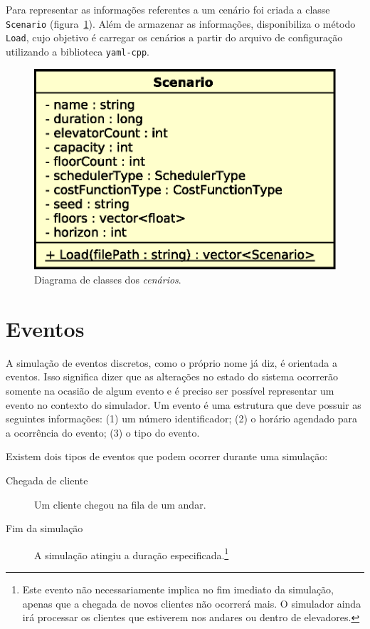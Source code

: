Para representar as informações referentes a um cenário foi criada a classe
\texttt{Scenario} (figura~\ref{fig:diagram:scenario}). Além de armazenar as
informações, disponibiliza o método \texttt{Load}, cujo objetivo é carregar os
cenários a partir do arquivo de configuração utilizando a biblioteca \texttt
{yaml-cpp}.

\begin{figure}[htb!]
  \centering
  \includegraphics[scale=0.6]{img/Scenario}
  \caption{Diagrama de classes dos \textit{cenários}.}
\label{fig:diagram:scenario}
\end{figure}

\section{\label{model:events}Eventos}

A simulação de eventos discretos, como o próprio nome já diz, é orientada a
eventos. Isso significa dizer que as alterações no estado do sistema ocorrerão
somente na ocasião de algum evento e é preciso ser possível representar um
evento no contexto do simulador. Um evento é uma estrutura que deve possuir as
seguintes informações: (1) um número identificador; (2) o horário agendado para
a ocorrência do evento; (3) o tipo do evento.

Existem dois tipos de eventos que podem ocorrer durante uma simulação:

\begin{description}
  \item[Chegada de cliente] Um cliente chegou na fila de um andar.

  \item[Fim da simulação] A simulação atingiu a duração
especificada.\footnote{Este evento não necessariamente implica no fim imediato
da simulação, apenas que a chegada de novos clientes não ocorrerá mais. O
simulador ainda irá processar os clientes que estiverem nos andares ou dentro de
elevadores.}

\end{description}

